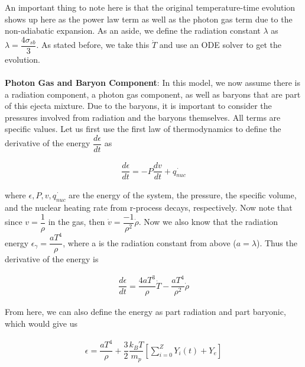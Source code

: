 \documentclass[11pt,a4paper]{article}
\begin{document}
 An important thing to note here is that the original temperature-time evolution shows up here as the power law term as well as the photon gas term due to the non-adiabatic expansion. As an aside, we define the radiation constant $\lambda$ as $\lambda =  \dfrac{4 \sigma_{sb}}{3}$. As stated before, we take this $\dot{T}$ and use an ODE solver to get the evolution.
\\\\
\textbf{Photon Gas and Baryon Component}: In this model, we now assume there is a radiation component, a photon gas component, as well as baryons that are part of this ejecta mixture. Due to the baryons, it is important to consider the pressures involved from radiation and the baryons themselves. All terms are specific values. Let us first use the first law of thermodynamics to define the derivative of the energy $\dfrac{d \epsilon}{dt}$ as

\begin{align}
	\dfrac{d \epsilon}{dt} = -P \dfrac{dv}{dt} + \dot{q_{nuc}}
\end{align}

where $\epsilon, P, v, \dot{q_{nuc}}$ are the energy of the system, the pressure, the specific volume, and the nuclear heating rate from r-process decays, respectively. Now note that since $ v = \dfrac{1}{\rho} $ in the gas, then $ \dot{v} = \dfrac{-1}{\rho ^2}\dot{\rho} $. Now we also know that the radiation energy  $\epsilon_{\gamma} =\dfrac{a T^4}{\rho}$, where a is the radiation constant from above ($a = \lambda$). Thus the derivative of the energy is 

\begin{align}
	\dfrac{d \epsilon}{dt} = \dfrac{4a T^3}{\rho} \dot{T} - 			\dfrac{a T^4}{\rho^2}\dot{\rho} 
\end{align}

From here, we can also define the energy as part radiation and part baryonic, which would give us 

\begin{align}
	\epsilon = \dfrac{a T^4}{\rho} + \dfrac{3}{2} \dfrac{k_B T}			{m_p} [\sum_{i=0}^{Z} Y_i(t) + Y_e] 
\end{align}
\end{document}
